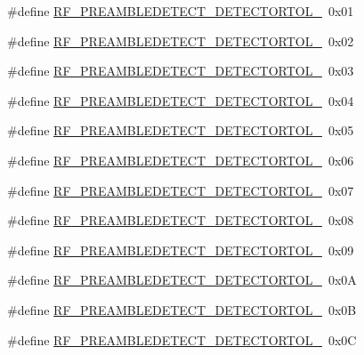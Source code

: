 \begin{DoxyCompactItemize}
\#define \mbox{\hyperlink{sx1276_regs-_fsk_8h_ad2ff8de8b56560355096d8a801ce5680}{R\+F\+\_\+\+P\+R\+E\+A\+M\+B\+L\+E\+D\+E\+T\+E\+C\+T\+\_\+\+D\+E\+T\+E\+C\+T\+O\+R\+T\+O\+L\+\_}}~0x01
\item 
\#define \mbox{\hyperlink{sx1276_regs-_fsk_8h_a5ba9d732666a53326a6d250c03a3bb5e}{R\+F\+\_\+\+P\+R\+E\+A\+M\+B\+L\+E\+D\+E\+T\+E\+C\+T\+\_\+\+D\+E\+T\+E\+C\+T\+O\+R\+T\+O\+L\+\_}}~0x02
\item 
\#define \mbox{\hyperlink{sx1276_regs-_fsk_8h_ab1241db9216a97e01cdae2448254397f}{R\+F\+\_\+\+P\+R\+E\+A\+M\+B\+L\+E\+D\+E\+T\+E\+C\+T\+\_\+\+D\+E\+T\+E\+C\+T\+O\+R\+T\+O\+L\+\_}}~0x03
\item 
\#define \mbox{\hyperlink{sx1276_regs-_fsk_8h_a95a2297e4d989009a9aa9381be6421b3}{R\+F\+\_\+\+P\+R\+E\+A\+M\+B\+L\+E\+D\+E\+T\+E\+C\+T\+\_\+\+D\+E\+T\+E\+C\+T\+O\+R\+T\+O\+L\+\_}}~0x04
\item 
\#define \mbox{\hyperlink{sx1276_regs-_fsk_8h_af616497c0128bb6a90bcc753f8b7cd98}{R\+F\+\_\+\+P\+R\+E\+A\+M\+B\+L\+E\+D\+E\+T\+E\+C\+T\+\_\+\+D\+E\+T\+E\+C\+T\+O\+R\+T\+O\+L\+\_}}~0x05
\item 
\#define \mbox{\hyperlink{sx1276_regs-_fsk_8h_a6fb0dbd911e9ed04d2f243052a818e19}{R\+F\+\_\+\+P\+R\+E\+A\+M\+B\+L\+E\+D\+E\+T\+E\+C\+T\+\_\+\+D\+E\+T\+E\+C\+T\+O\+R\+T\+O\+L\+\_}}~0x06
\item 
\#define \mbox{\hyperlink{sx1276_regs-_fsk_8h_a8fa771bedf632878d3a377491c0a31da}{R\+F\+\_\+\+P\+R\+E\+A\+M\+B\+L\+E\+D\+E\+T\+E\+C\+T\+\_\+\+D\+E\+T\+E\+C\+T\+O\+R\+T\+O\+L\+\_}}~0x07
\item 
\#define \mbox{\hyperlink{sx1276_regs-_fsk_8h_adb359b6eb996d119489f7d6afedc77a8}{R\+F\+\_\+\+P\+R\+E\+A\+M\+B\+L\+E\+D\+E\+T\+E\+C\+T\+\_\+\+D\+E\+T\+E\+C\+T\+O\+R\+T\+O\+L\+\_}}~0x08
\item 
\#define \mbox{\hyperlink{sx1276_regs-_fsk_8h_a8fe78c9fcf3aa09f5aa1831ba3c33b7a}{R\+F\+\_\+\+P\+R\+E\+A\+M\+B\+L\+E\+D\+E\+T\+E\+C\+T\+\_\+\+D\+E\+T\+E\+C\+T\+O\+R\+T\+O\+L\+\_}}~0x09
\item 
\#define \mbox{\hyperlink{sx1276_regs-_fsk_8h_ab7c305fbd95c7da0279d01830ca33de2}{R\+F\+\_\+\+P\+R\+E\+A\+M\+B\+L\+E\+D\+E\+T\+E\+C\+T\+\_\+\+D\+E\+T\+E\+C\+T\+O\+R\+T\+O\+L\+\_}}~0x0A
\item 
\#define \mbox{\hyperlink{sx1276_regs-_fsk_8h_ad65f1522c16c3d28b2ee4b8f0742962c}{R\+F\+\_\+\+P\+R\+E\+A\+M\+B\+L\+E\+D\+E\+T\+E\+C\+T\+\_\+\+D\+E\+T\+E\+C\+T\+O\+R\+T\+O\+L\+\_}}~0x0B
\item 
\#define \mbox{\hyperlink{sx1276_regs-_fsk_8h_a7d2f3b00426a551c8ae401881717dcca}{R\+F\+\_\+\+P\+R\+E\+A\+M\+B\+L\+E\+D\+E\+T\+E\+C\+T\+\_\+\+D\+E\+T\+E\+C\+T\+O\+R\+T\+O\+L\+\_}}~0x0C

\end{DoxyCompactItemize}
